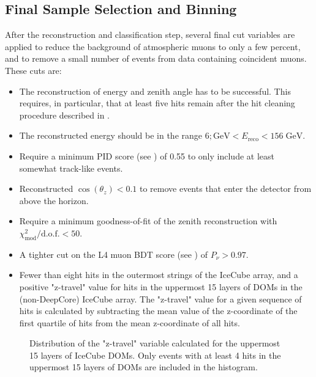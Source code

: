 \subsection{Final Sample Selection and Binning}
\label{sec:final-sample-binning}
After the reconstruction and classification step, several final cut variables are applied to reduce the background of atmospheric muons to only a few percent, and to remove a small number of events from data containing coincident muons. These cuts are:
\begin{itemize}
    \item The reconstruction of energy and zenith angle has to be successful. This requires, in particular, that at least five hits remain after the hit cleaning procedure described in .
    \item The reconstructed energy should be in the range $6;\mathrm{GeV} < E_{\mathrm{reco}} < 156\;\mathrm{GeV}$.
    \item Require a minimum PID score (see ) of 0.55 to only include at least somewhat track-like events.
    \item Reconstructed $\cos(\theta_z) < 0.1$ to remove events that enter the detector from above the horizon.
    \item Require a minimum goodness-of-fit of the zenith reconstruction with $\chi^2_{\mathrm{mod}}/\mathrm{d.o.f.} < 50$.
    \item A tighter cut on the L4 muon BDT score (see ) of $P_\nu > 0.97$.
    \item Fewer than eight hits in the outermost strings of the IceCube array, and a positive "z-travel" value for hits in the uppermost 15 layers of DOMs in the (non-DeepCore) IceCube array. The "z-travel" value for a given sequence of hits is calculated by subtracting the mean value of the z-coordinate of the first quartile of hits from the mean z-coordinate of all hits. 
\end{itemize}

\begin{figure}
    \centering
    
    \caption{Distribution of the "z-travel" variable calculated for the uppermost 15 layers of IceCube DOMs. Only events with at least 4 hits in the uppermost 15 layers of DOMs are included in the histogram.}
    \label{fig:z_travel_distribution}
\end{figure}

%     


